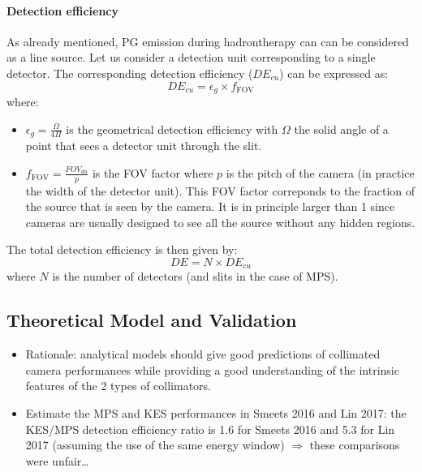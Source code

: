 \documentclass[a4paper,english]{article}
\begin{document}
\paragraph{Detection efficiency}

As already mentioned, PG emission during hadrontherapy can can be considered as a line source. Let us consider a detection unit corresponding to a single detector. The corresponding detection efficiency ($DE_{cu}$) can be expressed as:
\begin{equation}
	DE_{cu} = \epsilon_g\times f_\mathrm{FOV}
\end{equation}
where:
\begin{itemize}
	\item $\epsilon_g=\frac{\Omega}{4\Pi}$ is the geometrical detection efficiency with $\Omega$ the solid angle of a point that sees a detector unit through the slit.
	\item $f_\mathrm{FOV} = \frac{FOV_{du}}{p}$ is the FOV factor where $p$ is the pitch of the camera (in practice the width of the detector unit). This FOV factor correponds to the fraction of the source that is seen by the camera. It is in principle larger than 1 since cameras are usually designed to see all the source without any hidden regions.
\end{itemize}

The total detection efficiency is then given by:
\begin{equation}
	DE = N \times DE_{cu}
\end{equation}
where $N$ is the number of detectors (and slits in the case of MPS).


\subsection{Theoretical Model and Validation}

\begin{itemize}
  \item Rationale: analytical models should give good predictions of collimated camera performances while providing a good understanding of the intrinsic features of the 2 types of collimators. 
  \item Estimate the MPS and KES performances in Smeets 2016 and Lin 2017: the KES/MPS detection efficiency ratio is 1.6 for Smeets 2016 and 5.3 for Lin 2017 (assuming the use of the same energy window) $\Rightarrow$ these comparisons were unfair\dots    
\end{itemize}
\end{document}
